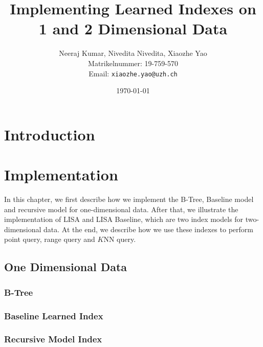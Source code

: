 \documentclass[a4paper,12pt]{scrreprt}
\title{Implementing Learned Indexes on 1 and 2 Dimensional Data}
\author{
  Neeraj Kumar, Nivedita Nivedita, Xiaozhe Yao\\[-5pt]
  \scriptsize Matrikelnummer: 19-759-570\\[-5pt]
  \scriptsize Email: \texttt{xiaozhe.yao@uzh.ch}
}
\date{\vspace*{2cm}\today}
\newenvironment{mscsummary}{\fbox{Summary}}{\\}
\begin{document}
\begingroup
\let\newpage\relax%
\maketitle
\newpage\null\thispagestyle{blank}\newpage
\setcounter{page}{0}
\endgroup

\begin{abstract}

\end{abstract}

\setcounter{tocdepth}{2}
\tableofcontents 

\chapter{Introduction}



\chapter{Implementation}

\begin{mscsummary}
	In this chapter, we first describe how we implement the B-Tree, Baseline model and recursive model for one-dimensional data. After that, we illustrate the implementation of LISA and LISA Baseline, which are two index models for two-dimensional data. At the end, we describe how we use these indexes to perform point query, range query and $K$NN query.
\end{mscsummary}

\section{One Dimensional Data}

\subsection{B-Tree}



\subsection{Baseline Learned Index}



\subsection{Recursive Model Index}
\end{document}
